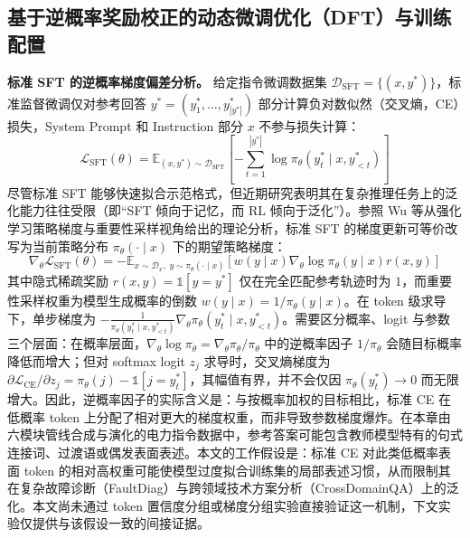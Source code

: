 \documentclass[fontset=fandol,type=master,campus=shenzhen,etitleauto=true]{hithesisbook}
\begin{document}
\subsection{基于逆概率奖励校正的动态微调优化（DFT）与训练配置}\label{ux8badux7ec3ux914dux7f6eux4e0eux4f18ux5316}

\textbf{标准 SFT 的逆概率梯度偏差分析。} 给定指令微调数据集 $\mathcal{D}_{\text{SFT}} = \{(x, y^*)\}$，标准监督微调仅对参考回答 $y^* = (y_1^*, \ldots, y_{|y^*|}^*)$ 部分计算负对数似然（交叉熵，CE）损失，System Prompt 和 Instruction 部分 $x$ 不参与损失计算：
\begin{equation}
\mathcal{L}_{\text{SFT}}(\theta) = \mathbb{E}_{(x, y^*) \sim \mathcal{D}_{\text{SFT}}} \left[ -\sum_{t=1}^{|y^*|} \log \pi_\theta(y_t^* \mid x, y_{<t}^*) \right]
\end{equation}
尽管标准 SFT 能够快速拟合示范格式，但近期研究表明其在复杂推理任务上的泛化能力往往受限（即``SFT 倾向于记忆，而 RL 倾向于泛化''）。参照 Wu 等\cite{ref82}从强化学习策略梯度与重要性采样视角给出的理论分析，标准 SFT 的梯度更新可等价改写为当前策略分布 $\pi_\theta(\cdot \mid x)$ 下的期望策略梯度：
\begin{equation}
\nabla_\theta \mathcal{L}_{\text{SFT}}(\theta) = -\mathbb{E}_{x \sim \mathcal{D}_x,\; y \sim \pi_\theta(\cdot \mid x)} \left[ w(y \mid x) \nabla_\theta \log \pi_\theta(y \mid x) r(x, y) \right]
\end{equation}
其中隐式稀疏奖励 $r(x, y) = \mathbb{1}[y = y^*]$ 仅在完全匹配参考轨迹时为 $1$，而重要性采样权重为模型生成概率的倒数 $w(y \mid x) = 1 / \pi_\theta(y \mid x)$。在 token 级求导下，单步梯度为 $-\frac{1}{\pi_\theta(y_t^* \mid x, y_{<t}^*)} \nabla_\theta \pi_\theta(y_t^* \mid x, y_{<t}^*)$。需要区分概率、logit 与参数三个层面：在概率层面，$\nabla_\theta \log \pi_\theta = \nabla_\theta \pi_\theta / \pi_\theta$ 中的逆概率因子 $1/\pi_\theta$ 会随目标概率降低而增大；但对 softmax logit $z_j$ 求导时，交叉熵梯度为 $\partial \mathcal{L}_{\text{CE}} / \partial z_j = \pi_\theta(j) - \mathbb{1}[j = y_t^*]$，其幅值有界，并不会仅因 $\pi_\theta(y_t^*) \to 0$ 而无限增大。因此，逆概率因子的实际含义是：与按概率加权的目标相比，标准 CE 在低概率 token 上分配了相对更大的梯度权重，而非导致参数梯度爆炸。在本章由六模块管线合成与演化的电力指令数据中，参考答案可能包含教师模型特有的句式连接词、过渡语或偶发表面表述。本文的工作假设是：标准 CE 对此类低概率表面 token 的相对高权重可能使模型过度拟合训练集的局部表述习惯，从而限制其在复杂故障诊断（FaultDiag）与跨领域技术方案分析（CrossDomainQA）上的泛化。本文尚未通过 token 置信度分组或梯度分组实验直接验证这一机制，下文实验仅提供与该假设一致的间接证据。
\end{document}
